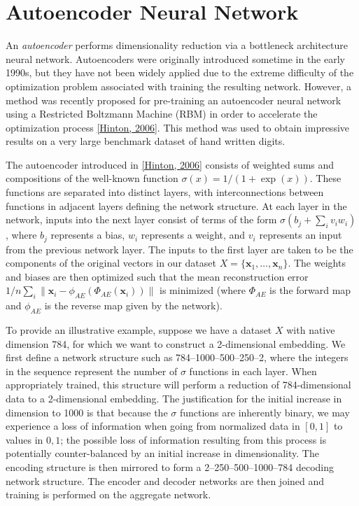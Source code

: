 \par
 \par
 \hypertarget{index_ate}{}\section{Autoencoder Neural Network}\label{index_ate}
An {\em autoencoder\/} performs dimensionality reduction via a bottleneck architecture neural network. Autoencoders were originally introduced sometime in the early 1990s, but they have not been widely applied due to the extreme difficulty of the optimization problem associated with training the resulting network. However, a method was recently proposed for pre-training an autoencoder neural network using a Restricted Boltzmann Machine (RBM) in order to accelerate the optimization process \hyperlink{index_ref}{\mbox{[}Hinton, 2006\mbox{]}}. This method was used to obtain impressive results on a very large benchmark dataset of hand written digits.

The autoencoder introduced in \hyperlink{index_ref}{\mbox{[}Hinton, 2006\mbox{]}} consists of weighted sums and compositions of the well-known function $\sigma(x) = 1/(1+\exp(x))$. These functions are separated into distinct layers, with interconnections between functions in adjacent layers defining the network structure. At each layer in the network, inputs into the next layer consist of terms of the form $\sigma ( b_j + \sum_i v_i w_i )$, where $b_j$ represents a bias, $w_i$ represents a weight, and $v_i$ represents an input from the previous network layer. The inputs to the first layer are taken to be the components of the original vectors in our dataset $X = \{\mathbf{x}_1, \dots, \mathbf{x}_n \}$. The weights and biases are then optimized such that the mean reconstruction error $1/n \sum_i \|\mathbf{x}_i - \phi_{AE}(\Phi_{AE}(\mathbf{x}_i))\|$ is minimized (where $\Phi_{AE}$ is the forward map and $\phi_{AE}$ is the reverse map given by the network).

To provide an illustrative example, suppose we have a dataset $X$ with native dimension 784, for which we want to construct a 2-dimensional embedding. We first define a network structure such as 784--1000--500--250--2, where the integers in the sequence represent the number of $\sigma$ functions in each layer. When appropriately trained, this structure will perform a reduction of 784-dimensional data to a 2-dimensional embedding. The justification for the initial increase in dimension to 1000 is that because the $\sigma$ functions are inherently binary, we may experience a loss of information when going from normalized data in $[0,1]$ to values in ${0,1}$; the possible loss of information resulting from this process is potentially counter-balanced by an initial increase in dimensionality. The encoding structure is then mirrored to form a 2--250--500--1000--784 decoding network structure. The encoder and decoder networks are then joined and training is performed on the aggregate network.

